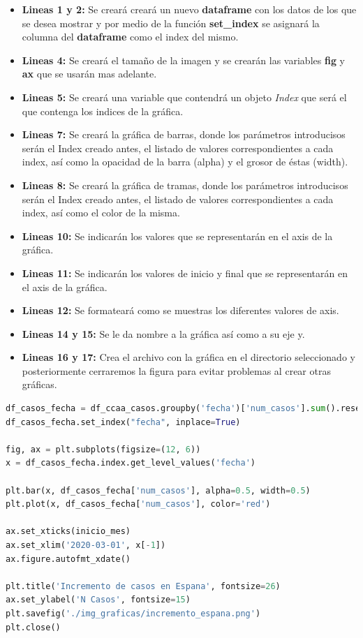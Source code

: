 \begin{itemize}
	\item \textbf{Lineas 1 y 2:} Se creará creará un nuevo \textbf{dataframe} con los datos de los que se desea mostrar y por medio de la función \textbf{set\_index} se asignará la columna del \textbf{dataframe} como el index del mismo.
	\item \textbf{Lineas 4:} Se creará el tamaño de la imagen y se crearán las variables \textbf{fig} y \textbf{ax} que se usarán mas adelante.
	\item \textbf{Lineas 5:} Se creará una variable que contendrá un objeto \textit{Index} que será el que contenga los indices de la gráfica.
	\item \textbf{Lineas 7:} Se creará la gráfica de barras, donde los parámetros introducisos serán el Index creado antes, el listado de valores correspondientes a cada index, así como la opacidad de la barra (alpha) y el grosor de éstas (width).
	\item \textbf{Lineas 8:} Se creará la gráfica de tramas, donde los parámetros introducisos serán el Index creado antes, el listado de valores correspondientes a cada index, así como el color de la misma.
	\item \textbf{Lineas 10:} Se indicarán los valores que se representarán en el axis de la gráfica.
	\item \textbf{Lineas 11:} Se indicarán los valores de inicio y final que se representarán en el axis de la gráfica.
	\item \textbf{Lineas 12:} Se formateará como se muestras los diferentes valores de axis.
	\item \textbf{Lineas 14 y 15:} Se le da nombre a la gráfica así como a su eje y.
	\item \textbf{Lineas 16 y 17:} Crea el archivo con la gráfica en el directorio seleccionado y posteriormente cerraremos la figura para evitar problemas al crear otras gráficas.
\end{itemize}

\begin{lstlisting}[language=Python, caption={Generár gráficos de barras y tramas.}, label={lst:barras}]
df_casos_fecha = df_ccaa_casos.groupby('fecha')['num_casos'].sum().reset_index()
df_casos_fecha.set_index("fecha", inplace=True)

fig, ax = plt.subplots(figsize=(12, 6))
x = df_casos_fecha.index.get_level_values('fecha')

plt.bar(x, df_casos_fecha['num_casos'], alpha=0.5, width=0.5)
plt.plot(x, df_casos_fecha['num_casos'], color='red')

ax.set_xticks(inicio_mes)
ax.set_xlim('2020-03-01', x[-1])
ax.figure.autofmt_xdate()

plt.title('Incremento de casos en Espana', fontsize=26)
ax.set_ylabel('N Casos', fontsize=15)
plt.savefig('./img_graficas/incremento_espana.png')
plt.close()
\end{lstlisting}

